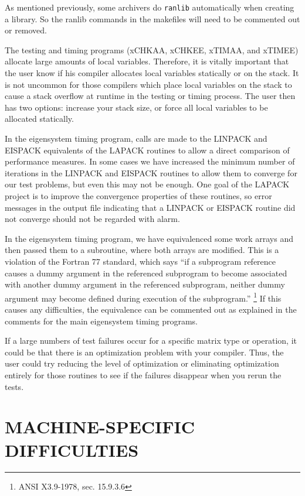 As mentioned previously, some archivers do {\tt ranlib} automatically 
when creating a library.  So the ranlib commands in the makefiles 
will need to be commented out or removed.

The testing and timing programs (xCHKAA, xCHKEE, xTIMAA, and xTIMEE)
allocate large amounts of local variables.  Therefore, it is vitally
important that the user know if his compiler allocates local
variables statically or on the stack.  It is not uncommon for those
compilers which place local variables on the stack to cause a stack
overflow at runtime in the testing or timing process.  The user then
has two options:  increase your stack size, or force all local variables
to be allocated statically.

In the eigensystem timing program, calls are made to the LINPACK
and EISPACK equivalents of the LAPACK routines to allow a direct
comparison of performance measures.
In some cases we have increased the minimum number of
iterations in the LINPACK and EISPACK routines to allow 
them to converge for our test problems, but
even this may not be enough.
One goal of the LAPACK project is to improve the convergence
properties of these routines, so error messages in the output
file indicating that a LINPACK or EISPACK routine did not
converge should not be regarded with alarm.

In the eigensystem timing program, we have equivalenced some work
arrays and then passed them to a subroutine, where both arrays are
modified.  This is a violation of the Fortran 77 standard, which
says ``if a subprogram reference causes a dummy argument in the 
referenced subprogram to become associated with another dummy
argument in the referenced subprogram, neither dummy argument may
become defined during execution of the subprogram.''
\footnote{ ANSI X3.9-1978, sec. 15.9.3.6} 
If this causes any difficulties, the equivalence
can be commented out as explained in the comments for the main
eigensystem timing programs.

If a large numbers of test failures occur for a specific matrix type 
or operation, it could be that there is an optimization problem with
your compiler.  Thus, the user could try reducing the level of 
optimization or eliminating optimization entirely for those routines
to see if the failures disappear when you rerun the tests.

\section*{MACHINE-SPECIFIC DIFFICULTIES}

